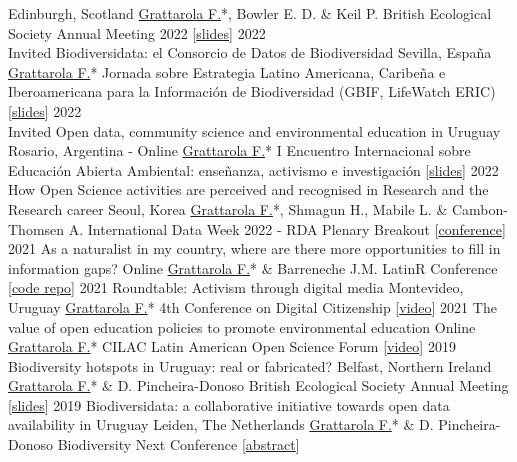 \documentclass[9pt]{developercv} %
\begin{document}
\begin{entrylist}
		{Edinburgh, Scotland}
		{\underline{Grattarola F.}*, Bowler E. D. \& Keil P. \slashsep British Ecological Society Annual Meeting 2022 [\href{https://flograttarola.com/pdf/Grattarola_BES2022_short.pdf}{slides}]}
	\entrylong
		{2022\\\footnotesize{Invited}}
		{Biodiversidata: el Consorcio de Datos de Biodiversidad}
		{Sevilla, España}
		{\underline{Grattarola F.}* \slashsep Jornada sobre Estrategia Latino Americana, Caribeña e Iberoamericana para la Información de Biodiversidad (GBIF, LifeWatch ERIC) [\href{https://flograttarola.com/pdf/Biodiversidata_Sevilla.pdf}{slides}]}
	\entrylong
		{2022\\\footnotesize{Invited}}
		{Open data, community science and environmental education in Uruguay}
		{Rosario, Argentina - Online}
		{\underline{Grattarola F.}* \slashsep I Encuentro Internacional sobre Educación Abierta Ambiental: enseñanza, activismo e investigación [\href{https://flograttarola.com/pdf/IEEAA_2022.pdf}{slides}]}
	\entrylong
		{2022}
		{How Open Science activities are perceived and recognised in Research and the Research career}
		{Seoul, Korea}
		{\underline{Grattarola F.}*, Shmagun H., Mabile L. \& Cambon-Thomsen A. \slashsep International Data Week 2022 - RDA Plenary Breakout [\href{https://www.idw2022.org}{conference}]}
	\entrylong
		{2021}
		{As a naturalist in my country, where are there more opportunities to fill in information gaps?}
		{Online}
		{\underline{Grattarola F.}* \& Barreneche J.M. \slashsep LatinR Conference [\href{https://github.com/bienflorencia/LatinR2021}{code repo}]}
	\entrylong
		{2021}
		{Roundtable: Activism through digital media}
		{Montevideo, Uruguay}
		{\underline{Grattarola F.}* \slashsep 4th Conference on Digital Citizenship [\href{https://youtu.be/NNA46QEZVQI}{video}]}
	\entrylong
		{2021}
		{The value of open education policies to promote environmental education}
		{Online}
		{\underline{Grattarola F.}* \slashsep CILAC Latin American Open Science Forum [\href{https://youtu.be/W6i6y87p2IM}{video}]}
	\entrylong
		{2019}
		{Biodiversity hotspots in Uruguay: real or fabricated?}
		{Belfast, Northern Ireland}
		{\underline{Grattarola F.}* \& D. Pincheira-Donoso \slashsep British Ecological Society Annual Meeting [\href{https://flograttarola.com/pdf/FGrattarola_BES2019_WEB.pdf}{slides}]}
	\entrylong
		{2019}
		{Biodiversidata: a collaborative initiative towards open data availability in Uruguay}
		{Leiden, The Netherlands}
		{\underline{Grattarola F.}* \& D. Pincheira-Donoso \slashsep Biodiversity Next Conference [\href{https://flograttarola.com/pdf/BISS_article_37715.pdf}{abstract}]}

\end{entrylist}
\end{document}

